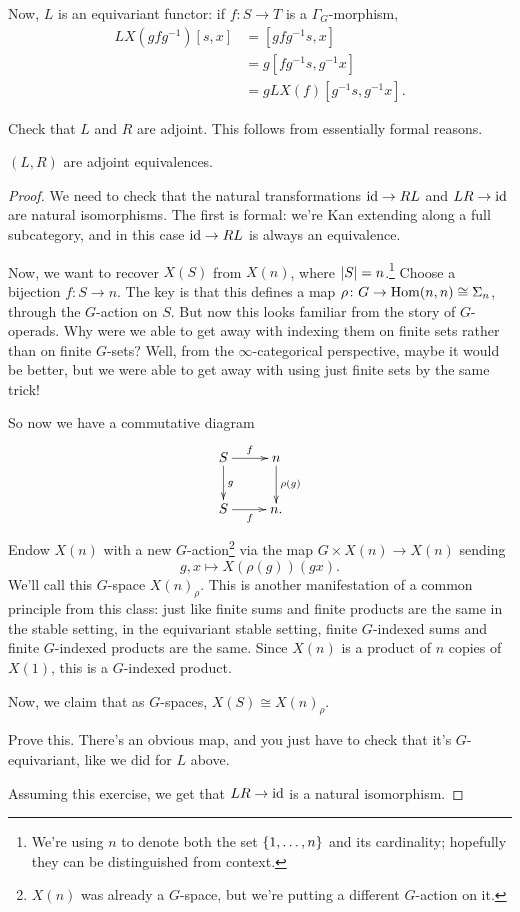 Now, $L$ is an equivariant functor: if $f\colon S\to T$ is a $\Gamma_G$-morphism,
\begin{align*}
	LX(gfg^{-1})[s,x] &= [gfg^{-1}s, x]\\
	&= g[fg^{-1}s, g^{-1}x]\\
	&= gLX(f)[g^{-1}s, g^{-1}x].
\end{align*}
\begin{ex}
Check that $L$ and $R$ are adjoint. This follows from essentially formal reasons.
\end{ex}
\begin{prop}
\label{LReq}
$(L,R)$ are adjoint equivalences.
\end{prop}
\begin{proof}
We need to check that the natural transformations $\mathrm{id}\to RL$ and $LR\to\mathrm{id}$ are natural isomorphisms. The first is
formal: we're Kan extending along a full subcategory, and in this case $\mathrm{id}\to RL$ is always an equivalence.

Now, we want to recover $X(S)$ from $X(n)$, where $\lvert S\rvert = n$.\footnote{We're using $n$ to denote both the set
$\{1,\dotsc,n\}$ and its cardinality; hopefully they can be distinguished from context.} Choose a bijection
$f\colon S\to n$. The key is that this defines a map $\rho\colon G\to\operatorname{Hom}(n, n)\cong\Sigma_n$, through the
$G$-action on $S$. But now this looks familiar from the story of $G$-operads. Why were we able to get away with
indexing them on finite sets rather than on finite $G$-sets? Well, from the $\infty$-categorical perspective, maybe
it would be better, but we were able to get away with using just finite sets by the same trick!

So now we have a commutative diagram
\[\xymatrix{
	S\ar[r]^f\ar[d]^g & n\ar[d]^{\rho(g)}\\
	S\ar[r]_f &n. 
}\]
Endow $X(n)$ with a new $G$-action\footnote{$X(n)$ was already a $G$-space, but we're putting a different
$G$-action on it.} via the map $G\times X(n)\to X(n)$ sending
\[g,x\mapsto X(\rho(g))(gx).\]
We'll call this $G$-space $X(n)_\rho$. This is another manifestation of a common principle from this class: just
like finite sums and finite products are the same in the stable setting, in the equivariant stable setting, finite
$G$-indexed sums and finite $G$-indexed products are the same. Since $X(n)$ is a product of $n$ copies of $X(1)$,
this is a $G$-indexed product.

Now, we claim that as $G$-spaces, $X(S)\cong X(n)_\rho$.
\begin{ex}
Prove this. There's an obvious map, and you just have to check that it's $G$-equivariant, like we did for $L$
above.
\end{ex}
Assuming this exercise, we get that $LR\to\mathrm{id}$ is a natural isomorphism.
\end{proof}
